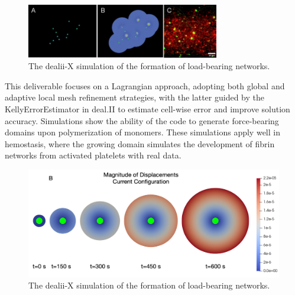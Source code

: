 \documentclass[a4paper,12pt]{article}
\begin{document}
\begin{figure}
  \centering

  \includegraphics[width=0.75\textwidth]{unibs-load-bearing-networks-1.png}

  \caption{The dealii-X simulation of the formation of load-bearing networks.}
  \label{fig:unibs-load-bearing-networks-1}
\end{figure}

This deliverable focuses on a Lagrangian approach, adopting both global and adaptive local mesh refinement strategies, with the latter guided by the KellyErrorEstimator in deal.II to estimate cell-wise error and improve solution accuracy. Simulations show the ability of the code to generate force-bearing domains upon polymerization of monomers. These simulations apply well in hemostasis, where the growing domain simulates the development of fibrin networks from activated platelets with real data.

\begin{figure}
  \centering

  \includegraphics[width=\textwidth]{unibs-load-bearing-networks-2.png}

  \caption{The dealii-X simulation of the formation of load-bearing networks.}
  \label{fig:unibs-load-bearing-networks-2}
\end{figure}
\end{document}
